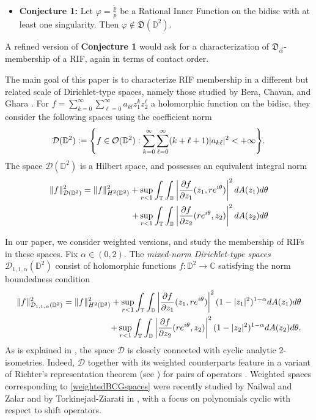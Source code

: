 \documentclass[11pt]{amsart}
\numberwithin{equation}{section}
\begin{document}
\begin{itemize}
\item \textbf{Conjecture 1:} Let $\varphi=\frac{\tilde{p}}{p}$ be a Rational Inner Function on the bidisc with at least one singularity. Then $\varphi\notin\mathfrak{D}(\mathbb{D}^2).$\\
\end{itemize}
A refined version of \textbf{Conjecture 1} would ask for a characterization of $\mathfrak{D}_{\vec{\alpha}}$-membership of a RIF, again in terms of contact order.

The main goal of this paper is to characterize RIF membership in a different but related scale of Dirichlet-type spaces, namely those studied by Bera, Chavan, and Ghara \cite{Chavan}. For $f=\sum_{k=0}^{\infty}\sum^{\infty}_{\ell=0} a_{kl}z_1^kz_2^{\ell}$ a holomorphic function on the bidisc, they consider the following spaces using the coefficient norm
\begin{align}
\mathcal{D}(\mathbb{D}^2):=\Biggl\{f\in \mathcal{O}(\mathbb{D}^2): \sum_{k=0}^{\infty}\sum_{\ell=0}^{\infty}(k+\ell+1)|a_{k\ell}|^2<+\infty\Biggr\}. \notag 
\end{align}
The space $\mathcal{D}(\mathbb{D}^2)$ is a Hilbert space, and possesses an equivalent integral norm
\begin{align}
\|f\|^2_{\mathcal{D}(\mathbb{D}^2)}=\|f\|_{H^2(\mathbb{D}^2)}^2+\sup_{r<1}\int_{\mathbb{T}}\int_{\mathbb{D}}\left|\frac{\partial f}{\partial z_1}(z_1,re^{i\theta})\right|^2dA(z_1)d\theta  \\+\sup_{r<1}\int_{\mathbb{T}}\int_{\mathbb{D}}\left|\frac{\partial f}{\partial z_2}(re^{i\theta},z_2)\right|^2dA(z_2)d\theta \notag
\end{align}

In our paper, we consider weighted versions, and study the membership of RIFs in these spaces. Fix $\alpha\in(0,2).$ The \textit{mixed-norm Dirichlet-type spaces} $\mathcal{D}_{1,1,\alpha}(\mathbb{D}^2)$ consist of holomorphic functions $f\colon \mathbb{D}^2\to \mathbb{C}$ satisfying the norm boundedness condition
\begin{align}
\|f\|^2_{\mathcal{D}_{1,1,\alpha}(\mathbb{D}^2)}=\|f\|_{H^2(\mathbb{D}^2)}^2+\sup_{r<1}\int_{\mathbb{T}}\int_{\mathbb{D}}\left|\frac{\partial f}{\partial z_1}(z_1,re^{i\theta})\right|^2(1-|z_1|^2)^{1-\alpha}dA(z_1)d\theta\\+\sup_{r<1}\int_{\mathbb{T}}\int_{\mathbb{D}}\left|\frac{\partial f}{\partial z_2}(re^{i\theta},z_2)\right|^2(1-|z_2|^2)^{1-\alpha}dA(z_2)d\theta \notag .
\label{weightedBCGspaces}
\end{align}
As is explained in \cite{Chavan}, the space $\mathcal{D}$ is closely connected with cyclic analytic $2$-isometries. Indeed, $\mathcal{D}$ together with its weighted counterparts feature in a variant of Richter's representation theorem (see \cite{Ransford}) for pairs of operators \cite[Theorem 2.4]{Chavan}. Weighted spaces corresponding to \eqref{weightedBCGspaces} were recently studied by Nailwal and Zalar and by Torkinejad-Ziarati in \cite{NZprep, Pouriya1}, with a focus on polynomials cyclic with respect to shift operators.
\end{document}
